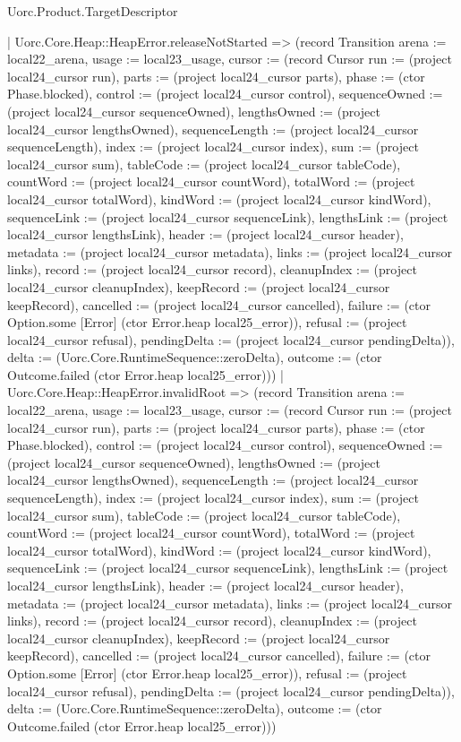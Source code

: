 \begin{lexlean}{Uorc.Product.TargetDescriptor}
\begin{semanticmodule}
{    | Uorc.Core.Heap::HeapError.releaseNotStarted => (record Transition {arena := local22_arena, usage := local23_usage, cursor := (record Cursor {run := (project local24_cursor run), parts := (project local24_cursor parts), phase := (ctor Phase.blocked), control := (project local24_cursor control), sequenceOwned := (project local24_cursor sequenceOwned), lengthsOwned := (project local24_cursor lengthsOwned), sequenceLength := (project local24_cursor sequenceLength), index := (project local24_cursor index), sum := (project local24_cursor sum), tableCode := (project local24_cursor tableCode), countWord := (project local24_cursor countWord), totalWord := (project local24_cursor totalWord), kindWord := (project local24_cursor kindWord), sequenceLink := (project local24_cursor sequenceLink), lengthsLink := (project local24_cursor lengthsLink), header := (project local24_cursor header), metadata := (project local24_cursor metadata), links := (project local24_cursor links), record := (project local24_cursor record), cleanupIndex := (project local24_cursor cleanupIndex), keepRecord := (project local24_cursor keepRecord), cancelled := (project local24_cursor cancelled), failure := (ctor Option.some [Error] (ctor Error.heap local25_error)), refusal := (project local24_cursor refusal), pendingDelta := (project local24_cursor pendingDelta)}), delta := (Uorc.Core.RuntimeSequence::zeroDelta), outcome := (ctor Outcome.failed (ctor Error.heap local25_error))})
    | Uorc.Core.Heap::HeapError.invalidRoot => (record Transition {arena := local22_arena, usage := local23_usage, cursor := (record Cursor {run := (project local24_cursor run), parts := (project local24_cursor parts), phase := (ctor Phase.blocked), control := (project local24_cursor control), sequenceOwned := (project local24_cursor sequenceOwned), lengthsOwned := (project local24_cursor lengthsOwned), sequenceLength := (project local24_cursor sequenceLength), index := (project local24_cursor index), sum := (project local24_cursor sum), tableCode := (project local24_cursor tableCode), countWord := (project local24_cursor countWord), totalWord := (project local24_cursor totalWord), kindWord := (project local24_cursor kindWord), sequenceLink := (project local24_cursor sequenceLink), lengthsLink := (project local24_cursor lengthsLink), header := (project local24_cursor header), metadata := (project local24_cursor metadata), links := (project local24_cursor links), record := (project local24_cursor record), cleanupIndex := (project local24_cursor cleanupIndex), keepRecord := (project local24_cursor keepRecord), cancelled := (project local24_cursor cancelled), failure := (ctor Option.some [Error] (ctor Error.heap local25_error)), refusal := (project local24_cursor refusal), pendingDelta := (project local24_cursor pendingDelta)}), delta := (Uorc.Core.RuntimeSequence::zeroDelta), outcome := (ctor Outcome.failed (ctor Error.heap local25_error))})
}
\end{semanticmodule}
\end{lexlean}
